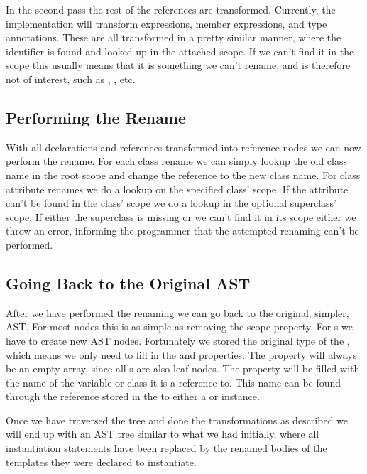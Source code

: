 In the second pass the rest of the references are transformed.
Currently, the implementation will transform  expressions, member expressions, and type annotations.
These are all transformed in a pretty similar manner, where the identifier is found and looked up in the attached scope.
If we can't find it in the scope this usually means that it is something we can't rename, and is therefore not of interest, such as , , etc.

\subsection{Performing the Rename}\label{subsec:performing-the-rename}

With all declarations and references transformed into reference nodes we can now perform the rename.
For each class rename we can simply lookup the old class name in the root scope and change the reference to the new class name.
For class attribute renames we do a lookup on the specified class' scope.
If the attribute can't be found in the class' scope we do a lookup in the optional superclass' scope.
If either the superclass is missing or we can't find it in its scope either we throw an error, informing the programmer that the attempted renaming can't be performed.

\subsection{Going Back to the Original AST}\label{subsec:going-back-to-the-original-ast}

After we have performed the renaming we can go back to the original, simpler, AST\@.
For most nodes this is as simple as removing the scope property.
For s we have to create new AST nodes.
Fortunately we stored the original type of the , which means we only need to fill in the  and  properties.
The  property will always be an empty array, since all s are also leaf nodes.
The  property will be filled with the name of the variable or class it is a reference to.
This name can be found through the reference stored in the  to either a  or  instance.

Once we have traversed the tree and done the transformations as described we will end up with an AST tree similar to what we had initially, where all instantiation statements have been replaced by the renamed bodies of the templates they were declared to instantiate.

